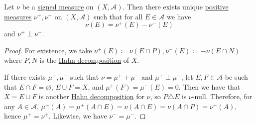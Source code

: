 \begin{theorem}\label{thm:Jordan-decomposition-theorem}
	Let \(\nu\) be a \hyperref[def:signed-measure]{signed measure} on \((X, \mathcal{A})\). Then there exists unique \hyperref[def:measure]{positive measures} \(\nu^+,\nu^-\)
	on \((X, \mathcal{A})\) such that for all \(E \in \mathcal{A}\) we have
	\[
		\nu(E) = \nu^+(E) - \nu^-(E)
	\]
	and \(\nu^+ \perp \nu^-\).
\end{theorem}
\begin{proof}
	For existence, we take \(\nu^+(E) \coloneqq \nu(E \cap P), \nu^-(E) \coloneqq -\nu(E \cap N)\) where \(P, N\) is the
	\hyperref[thm:Hahn-decomposition-theorem]{Hahn decomposition} of \(X\).

	If there exists \(\mu ^+, \mu ^-\) such that \(\nu = \mu ^+ + \mu ^-\) and \(\mu ^+ \perp \mu ^-\), let \(E, F\in \mathcal{A} \) be
	such that \(E\cap F = \varnothing \), \(E\cup F= X\), and \(\mu ^+(F) = \mu ^-(E) = 0\). Then we have that \(X = E \cup F\) is another
	\hyperref[thm:Hahn-decomposition-theorem]{Hahn decomposition} for \(\nu \), so \(P\triangle E\) is \(\nu\)-null. Therefore, for any
	\(A \in \mathcal{A} \), \(\mu ^+(A) = \mu ^+(A \cap E) = \nu (A \cap E) = \nu (A \cap P) = \nu ^+(A)\), hence \(\mu ^+ = \nu ^+\).
	Likewise, we have \(\nu ^- = \mu ^-\).
\end{proof}